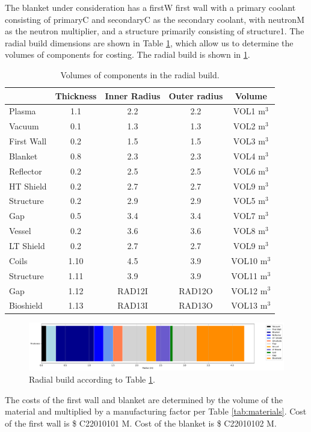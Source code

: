 The blanket under consideration has a firstW first wall with a primary coolant consisting of primaryC and secondaryC as the secondary coolant, with neutronM as the neutron multiplier, and a structure primarily consisting of structure1. The radial build dimensions are shown in Table \ref{tab:volumes}, which allow us to determine the volumes of components for costing.  The radial build is shown in \ref{fig:radial}.  \\


\begin{table}[h!]
    \centering
    \begin{tabular}{l c  c c c}
    \hline
        &	Thickness	&	Inner Radius	&	Outer radius	&	Volume		\\
        \hline
Plasma	&	1.1	&	2.2	&	2.2	&	VOL1	m$^{3}$	\\
Vacuum	&	0.1	&	1.3	&	1.3	&	VOL2	m$^{3}$	\\
First Wall	&	0.2	&	1.5	&	1.5	&	VOL3	m$^{3}$	\\
Blanket	&	0.8	&	2.3	&	2.3	&	VOL4	m$^{3}$	\\
Reflector	&	0.2	&	2.5	&	2.5	&	VOL6	m$^{3}$	\\
HT Shield	&	0.2	&	2.7	&	2.7	&	VOL9	m$^{3}$	\\
Structure	&	0.2	&	2.9	&	2.9	&	VOL5	m$^{3}$	\\
Gap	&	0.5	&	3.4	&	3.4	&	VOL7	m$^{3}$	\\
Vessel	&	0.2	&	3.6	&	3.6	&	VOL8	m$^{3}$	\\
LT Shield	&	0.2	&	2.7	&	2.7	&	VOL9	m$^{3}$	\\
Coils	&	1.10	&	4.5	&	3.9	&	VOL10	m$^{3}$	\\
Structure	&	1.11	&	3.9	&	3.9	&	VOL11	m$^{3}$	\\
Gap	&	1.12	&	RAD12I	&	RAD12O	&	VOL12	m$^{3}$	\\
Bioshield	&	1.13	&	RAD13I	&	RAD13O	&	VOL13	m$^{3}$	\\

        \hline
    \end{tabular}
    \caption{Volumes of components in the radial build.}
    \label{tab:volumes}
\end{table}

\begin{figure}
    \centering
    \includegraphics[width=0.9\linewidth]{Figures/radial_build.pdf}
    \caption{Radial build according to Table \ref{tab:volumes}.}
    \label{fig:radial}
\end{figure}



The costs of the first wall and blanket are determined by the volume of the material and multiplied by a manufacturing factor per Table \ref{tab:materials}.   Cost of the first wall is \$ C22010101 M.  Cost of the blanket is \$ C22010102 M.

